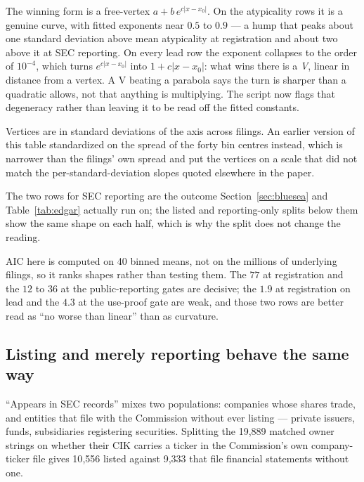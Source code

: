 \noindent The winning form is a free-vertex $a + b\,e^{c|x-x_0|}$. On the
atypicality rows it is a genuine curve, with fitted exponents near $0.5$ to
$0.9$ --- a hump that peaks about one standard deviation above mean
atypicality at registration and about two above it at SEC reporting. On every
lead row the exponent collapses to the order of $10^{-4}$, which turns
$e^{c|x-x_0|}$ into $1 + c|x-x_0|$: what wins there is a \emph{V}, linear in
distance from a vertex. A V beating a parabola says the turn is sharper than a
quadratic allows, not that anything is multiplying. The script now flags that
degeneracy rather than leaving it to be read off the fitted constants.

Vertices are in standard deviations of the axis across filings. An earlier
version of this table standardized on the spread of the forty bin centres
instead, which is narrower than the filings' own spread and put the vertices
on a scale that did not match the per-standard-deviation slopes quoted
elsewhere in the paper.

The two rows for SEC reporting are the outcome Section~\ref{sec:bluesea} and
Table~\ref{tab:edgar} actually run on; the listed and reporting-only splits
below them show the same shape on each half, which is why the split does not
change the reading.

AIC here is computed on 40 binned means, not on the millions of underlying
filings, so it ranks shapes rather than testing them. The $77$ at registration
and the $12$ to $36$ at the public-reporting gates are decisive; the $1.9$ at
registration on lead and the $4.3$ at the use-proof gate are weak, and those
two rows are better read as ``no worse than linear'' than as curvature.

\subsection{Listing and merely reporting behave the same way}

``Appears in SEC records'' mixes two populations: companies whose shares trade, and entities that file with
the Commission without ever listing --- private issuers, funds, subsidiaries
registering securities. Splitting the 19{,}889 matched owner strings on whether
their CIK carries a ticker in the Commission's own company-ticker file gives
10{,}556 listed against 9{,}333 that file financial statements without one.


